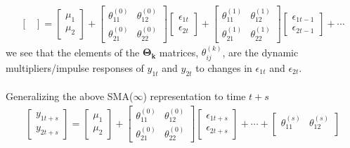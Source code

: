 \documentclass[a4paper,11pt,listof=nochaptergap,oneside,pointednumbers,bibtotoc,bigheadings,liststotoc]{scrbook}
\theoremstyle{mysatz}
\theoremstyle{mydefinition}
\theoremstyle{mybemerkung}
\newcommand{\vect}[1]{\boldsymbol{\mathbf{#1}}}
\begin{document}
\begin{itemize}
\begin{equation}
\begin{split}
\begin{bmatrix}
 	\end{bmatrix} 
	=
	\begin{bmatrix}
    	\mu_1 \\
    	\mu_2
 	\end{bmatrix} + 
	\begin{bmatrix}
    	\theta_{11}^{(0)} & \theta_{12}^{(0)}\\
    	\theta_{21}^{(0)} & \theta_{22}^{(0)}
 	\end{bmatrix} 
	\begin{bmatrix}
    	\epsilon_{1t} \\
	\epsilon_{2t}
 	\end{bmatrix} + 
	\begin{bmatrix}
    	\theta_{11}^{(1)} & \theta_{12}^{(1)}\\
    	\theta_{21}^{(1)} & \theta_{22}^{(1)}
 	\end{bmatrix} 
	\begin{bmatrix}
    	\epsilon_{1t-1} \\
	\epsilon_{2t-1}
 	\end{bmatrix} + \cdots 
\end{split}								
\end{equation}
we see that the elements of the $\vect{\Theta_k}$ matrices, $\theta_{ij}^{(k)}$, are the dynamic multipliers/impulse responses of $y_{1t}$ and $y_{2t}$ to changes in $\epsilon_{1t}$ and $\epsilon_{2t}$.\\
\\
Generalizing the above SMA($\infty$) representation to time $t+s$
\begin{equation} \label{eq:svar10}
\begin{split}
	\begin{bmatrix}
    	y_{1t+s} \\
    	y_{2t+s}
 	\end{bmatrix} 
	=
	\begin{bmatrix}
    	\mu_1 \\
    	\mu_2
 	\end{bmatrix} + 
	\begin{bmatrix}
    	\theta_{11}^{(0)} & \theta_{12}^{(0)}\\
    	\theta_{21}^{(0)} & \theta_{22}^{(0)}
 	\end{bmatrix} 
	\begin{bmatrix}
    	\epsilon_{1t + s} \\
	\epsilon_{2t+s}
 	\end{bmatrix} + \cdots +
	\begin{bmatrix}
    	\theta_{11}^{(s)} & \theta_{12}^{(s)}\\

\end{bmatrix}
\end{split}
\end{equation}
\end{itemize}
\end{document}

